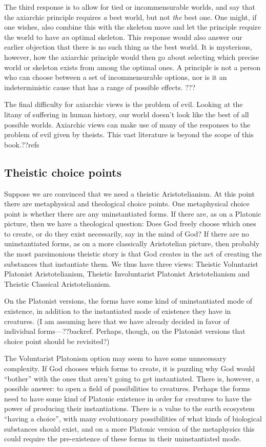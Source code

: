 The third response is to allow for tied or incommensurable worlds, and say that the axiarchic principle requires \textit{a} best world,
but not \textit{the} best one. One might, if one wishes, also combine this with the skeleton move and let the principle require the world
to have \textit{an} optimal skeleton. This response would also answer our earlier objection that there is no such thing as the best world.
It is mysterious, however, how the axiarchic principle would then go about selecting which precise world or skeleton exists from among the
optimal ones. A principle is not a person who can choose between a set of incommensurable options, nor is it an indeterministic cause that
has a range of possible effects. ???

The final difficulty for axiarchic views is the problem of evil. Looking at the litany of suffering in human history, 
our world doesn't look like the best of all possible worlds. Axiarchic views can make use of many of the responses to 
the problem of evil given by theists. This vast literature is beyond the scope of this book.??refs

\subsection{Theistic choice points}
Suppose we are convinced that we need a theistic Aristotelianism.
At this point there are metaphysical and theological choice points. One metaphysical choice point is whether there are any
uninstantiated forms. If there are, as on a Platonic picture, then we have a theological question: Does God freely choose which ones
to create, or do they exist necessarily, say in the mind of God? If there are no uninstantiated forms, as on a more classically 
Aristotelian picture, then probably the most parsimonious theistic story is that God creates in the act of creating the substances 
that instantiate them. We thus have three views: Theistic Voluntarist Platonist Aristotelianism, Theistic Involuntarist Platonist Aristotelianism
and Theistic Classical Aristotelianism.

On the Platonist versions, the forms have some kind of uninstantiated mode of existence, in addition to the instantiated mode of 
existence they have in creatures. (I am assuming here that we have already decided in favor of individual forms---??backref. Perhaps,
though, on the Platonist versions that choice point should be revisited?)

The Voluntarist Platonism option may seem to have some unnecessary complexity. If God chooses which forms to create, it is 
puzzling why God would ``bother'' with the ones that aren't going to get instantiated. There is, however, a possible answer:
to open a field of possibilities to creatures. Perhaps the forms need to have some kind of Platonic existence in order for
creatures to have the power of producing their instantiations. There is a value to the earth ecosystem ``having a choice'', with
many evolutionary possibilities of what kinds of biological substances should exist, and on a more Platonic version of the 
metaphysics this could require the pre-existence of these forms in their uninstantiated mode. 

